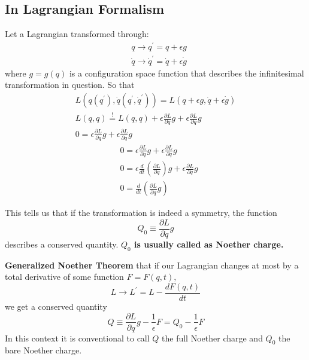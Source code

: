 \subsection{In Lagrangian Formalism}
Let a Lagrangian transformed through:
\begin{equation}
\begin{aligned}
&q \rightarrow q^{\prime}=q+\epsilon g\\
&\dot{q} \rightarrow \dot{q}^{\prime}=\dot{q}+\epsilon \dot{g}
\end{aligned}
\end{equation}
where $g=g(q)$ is a configuration space function that describes the infinitesimal transformation in question. So that
$$
\begin{array}{l}
{L\left(q\left(q^{\prime}\right), \dot{q}\left(q^{\prime}, \dot{q}^{\prime}\right)\right)=L(q+\epsilon g, \dot{q}+\epsilon \dot{g})} \\
{L(q, q) \stackrel{!}{=} L(q, q)+\epsilon \frac{\partial L}{\partial q} g+\epsilon \frac{\partial L}{\partial \dot{q}} g} \\
{0=\epsilon \frac{\partial L}{\partial q} g+\epsilon \frac{\partial L}{\partial q} g}
\end{array}
$$
$$
\begin{aligned}
&0=\epsilon \frac{\partial L}{\partial q} g+\epsilon \frac{\partial L}{\partial q} g\\
&0=\epsilon \frac{d}{d t}\left(\frac{\partial L}{\partial q}\right) g+\epsilon \frac{\partial L}{\partial q} g\\
&0=\frac{d}{d t}\left(\frac{\partial L}{\partial q} g\right)
\end{aligned}
$$
\begin{qt}
This tells us that if the transformation is indeed a symmetry, the function
\begin{equation}
Q_{0} \equiv \frac{\partial L}{\partial \dot{q}} g
\end{equation}
describes a conserved quantity. \textbf{$Q_0$ is usually called as Noether charge.}
\end{qt}
\begin{qt}
\textbf{Generalized Noether Theorem}
that if our Lagrangian changes at most by a total derivative of some function $F=F(q, t),$ 
$$
L \rightarrow L^{\prime}=L-\frac{d F(q, t)}{d t}
$$
we get a conserved quantity
\begin{equation}
Q \equiv \frac{\partial L}{\partial \dot{q}} g-\frac{1}{\epsilon} F = Q_{0}-\frac{1}{\epsilon} F
\end{equation}
In this context it is conventional to call $Q$ the full Noether charge and $Q_{0}$ the bare Noether charge.
\end{qt}

